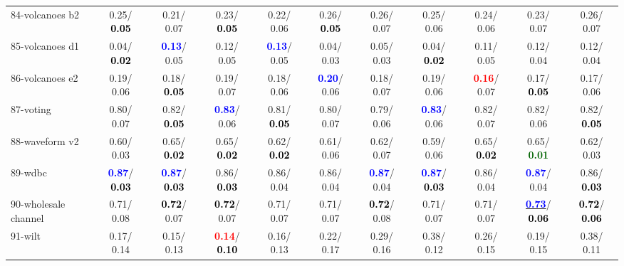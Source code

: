 \begin{table}[h]
\begin{center}
{\begin{tabular}{lc|c|c|c|c|c|c|c|c|c}
84-volcanoes b2 &   0.25/\textcolor{black}{\textbf{  0.05}} &   0.21/  0.07 &   0.23/\textcolor{black}{\textbf{  0.05}} &   0.22/  0.06 &   0.26/\textcolor{black}{\textbf{  0.05}} &   0.26/  0.07 &   0.25/  0.06 &   0.24/  0.06 &   0.23/  0.07 &   0.26/  0.07 \\
85-volcanoes d1 &   0.04/\textcolor{black}{\textbf{  0.02}} & \textcolor{blue}{\textbf{  0.13}}/  0.05 &   0.12/  0.05 & \textcolor{blue}{\textbf{  0.13}}/  0.05 &   0.04/  0.03 &   0.05/  0.03 &   0.04/\textcolor{black}{\textbf{  0.02}} &   0.11/  0.05 &   0.12/  0.04 &   0.12/  0.04 \\ \hline
86-volcanoes e2 &   0.19/  0.06 &   0.18/\textcolor{black}{\textbf{  0.05}} &   0.19/  0.07 &   0.18/  0.06 & \textcolor{blue}{\textbf{  0.20}}/  0.06 &   0.18/  0.07 &   0.19/  0.06 & \textcolor{red}{\textbf{  0.16}}/  0.07 &   0.17/\textcolor{black}{\textbf{  0.05}} &   0.17/  0.06 \\
87-voting &   0.80/  0.07 &   0.82/\textcolor{black}{\textbf{  0.05}} & \textcolor{blue}{\textbf{  0.83}}/  0.06 &   0.81/\textcolor{black}{\textbf{  0.05}} &   0.80/  0.07 &   0.79/  0.06 & \textcolor{blue}{\textbf{  0.83}}/  0.06 &   0.82/  0.07 &   0.82/  0.06 &   0.82/\textcolor{black}{\textbf{  0.05}} \\
88-waveform v2 &   0.60/  0.03 &   0.65/\textcolor{black}{\textbf{  0.02}} &   0.65/\textcolor{black}{\textbf{  0.02}} &   0.62/\textcolor{black}{\textbf{  0.02}} &   0.61/  0.06 &   0.62/  0.07 &   0.59/  0.06 &   0.65/\textcolor{black}{\textbf{  0.02}} &   0.65/\textcolor{darkgreen}{\textbf{  0.01}} &   0.62/  0.03 \\
89-wdbc & \textcolor{blue}{\textbf{  0.87}}/\textcolor{black}{\textbf{  0.03}} & \textcolor{blue}{\textbf{  0.87}}/\textcolor{black}{\textbf{  0.03}} &   0.86/\textcolor{black}{\textbf{  0.03}} &   0.86/  0.04 &   0.86/  0.04 & \textcolor{blue}{\textbf{  0.87}}/  0.04 & \textcolor{blue}{\textbf{  0.87}}/\textcolor{black}{\textbf{  0.03}} &   0.86/  0.04 & \textcolor{blue}{\textbf{  0.87}}/  0.04 &   0.86/\textcolor{black}{\textbf{  0.03}} \\
90-wholesale channel &   0.71/  0.08 & \textcolor{black}{\textbf{  0.72}}/  0.07 & \textcolor{black}{\textbf{  0.72}}/  0.07 &   0.71/  0.07 &   0.71/  0.07 & \textcolor{black}{\textbf{  0.72}}/  0.08 &   0.71/  0.07 &   0.71/  0.07 & \underline{\textcolor{blue}{\textbf{  0.73}}}/\textcolor{black}{\textbf{  0.06}} & \textcolor{black}{\textbf{  0.72}}/\textcolor{black}{\textbf{  0.06}} \\
91-wilt &   0.17/  0.14 &   0.15/  0.13 & \textcolor{red}{\textbf{  0.14}}/\textcolor{black}{\textbf{  0.10}} &   0.16/  0.13 &   0.22/  0.17 &   0.29/  0.16 &   0.38/  0.12 &   0.26/  0.15 &   0.19/  0.15 &   0.38/  0.11 \\

\end{tabular}}
\end{center}
\end{table}
